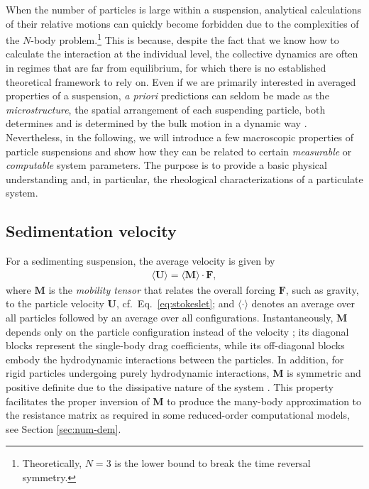 When the number of particles is large within a suspension, analytical calculations of their relative motions can quickly become forbidden due to the complexities of the $N$-body problem.\footnote{Theoretically, $N = 3$ is the lower bound to break the time reversal symmetry.}
This is because, despite the fact that we know how to calculate the interaction at the individual level, the collective dynamics are often in regimes that are far from equilibrium, for which there is no established theoretical framework to rely on.
Even if we are primarily interested in averaged properties of a suspension, \emph{a priori} predictions can seldom be made as the \emph{microstructure}, \ie the spatial arrangement of each suspending particle, both determines and is determined by the bulk motion in a dynamic way \citep{Brady_Bossis1988}.
Nevertheless, in the following, we will introduce a few macroscopic properties of particle suspensions and show how they can be related to certain \emph{measurable} or \emph{computable} system parameters. The purpose is to provide a basic physical understanding and, in particular, the rheological characterizations of a particulate system.

\subsection{Sedimentation velocity}

For a sedimenting suspension, the average velocity is given by
\begin{equation}
 \begin{aligned}
   \langle {\bm U} \rangle = \langle {\bm M} \rangle \cdot {\bm F},
 \end{aligned}
\end{equation}
where ${\bm M}$ is the \emph{mobility tensor} that relates the overall forcing ${\bm F}$, such as gravity, to the particle velocity ${\bm U}$, cf.\ Eq.\ \eqref{eq:stokeslet}; and $\langle \cdot \rangle$ denotes an average over all particles followed by an average over all configurations. Instantaneously, ${\bm M}$ depends only on the particle configuration instead of the velocity \citep{durlofsky_brady_bossis_1987}; its diagonal blocks represent the single-body drag coefficients, while its off-diagonal blocks embody the hydrodynamic interactions between the particles. In addition, for rigid particles undergoing purely hydrodynamic interactions, ${\bm M}$ is symmetric and positive definite due to the dissipative nature of the system \citep{graham_2018}. This property facilitates the proper inversion of ${\bm M}$ to produce the many-body approximation to the resistance matrix as required in some reduced-order computational models, see Section \ref{sec:num-dem}.

